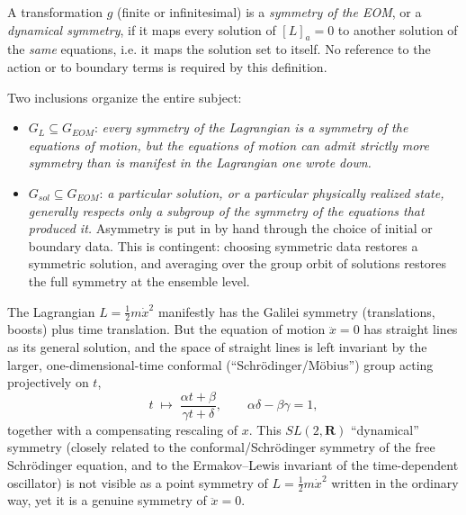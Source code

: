 \begin{definition}
A transformation $g$ (finite or infinitesimal) is a \emph{symmetry of the EOM},
    or a \emph{dynamical symmetry}, if it maps every solution of $[L]_a=0$ to 
    another solution of the \emph{same} equations, i.e. it maps the solution 
    set to itself. No reference to the action or to boundary terms is required 
    by this definition.
\end{definition}

Two inclusions organize the entire subject:
\begin{itemize}
    \item $G_L \subseteq G_{EOM}$: \emph{every symmetry of the Lagrangian is a
        symmetry of the equations of motion, but the equations of motion can
        admit strictly more symmetry than is manifest in the Lagrangian one
        wrote down.} 
    \item $G_{sol} \subseteq G_{EOM}$: \emph{a particular solution, or a
        particular physically realized state, generally respects only a
        subgroup of the symmetry of the equations that produced it.} 
        Asymmetry is put in by hand
        through the choice of initial or boundary data. This is contingent:
        choosing symmetric data restores a symmetric solution, and averaging
        over the group orbit of solutions restores the full symmetry at the
        ensemble level.
   \end{itemize}

\begin{example}
The Lagrangian $L=\tfrac12 m\dot x^2$ manifestly has the Galilei symmetry
    (translations, boosts) plus time translation. But the equation of motion
    $\ddot x=0$ has straight lines as its general solution, and the space of
    straight lines is left invariant by the larger, one-dimensional-time
    conformal (``Schr\"odinger/M\"obius'') group acting projectively on $t$,
\[
t \;\longmapsto\; \frac{\alpha t+\beta}{\gamma t+\delta},
    \qquad \alpha\delta-\beta\gamma=1,
\]
together with a compensating rescaling of $x$. This $SL(2,\mathbf R)$ ``dynamical''
    symmetry (closely related to the conformal/Schr\"odinger symmetry of the
    free Schr\"odinger equation, and to the Ermakov--Lewis invariant of the
    time-dependent oscillator) is not visible as a point symmetry of
    $L=\tfrac12 m\dot x^2$ written in the ordinary way, yet it is a genuine
    symmetry of $\ddot x=0$.
\end{example}


